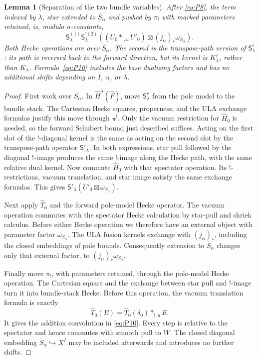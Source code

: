 \documentclass[11pt]{article}
\numberwithin{equation}{section}
\newtheorem{lemma}[theorem]{Lemma}
\theoremstyle{definition}
\theoremstyle{remark}
\begin{document}
\begin{lemma}[Separation of the two bundle variables]
\label{planch:separation}
After \eqref{eq:P8}, the term indexed by $\lambda$, star extended to
$\overline S_\alpha$ and pushed by $\pi_!$ with marked parameters
retained, is, modulo $u$-constants,
\begin{equation}
 \mathsf S_\lambda^{(1)}\mathsf S_\lambda^{\prime(2)}
 \left((U_0*_{!,u}U'_0)\boxtimes
                    (j_\alpha)_*\omega_{S_\alpha}\right).
 \label{eq:P10}
\end{equation}
Both Hecke operations are over $\overline S_\alpha$.  The second is
the transpose-path version of $\mathsf S_\lambda^r$: its path is
reversed back to the forward direction, but its kernel is
$K_\lambda^r$, rather than $K_\lambda$.  Formula~\eqref{eq:P10}
includes the base dualizing factors and has no additional shifts
depending on $I$, $\alpha$, or $\lambda$.
\end{lemma}

\begin{proof}
First work over $S_\alpha$.  In
$\widehat H^\lambda(\widehat F)$, move
$\mathsf S_\lambda^r$ from the pole model to the bundle stack.
The Cartesian Hecke squares, properness, and the ULA exchange formulas
justify this move through $\pi^!$.  Only the vacuum restriction for
$\widehat H_0$ is needed, so the forward Schubert bound just described
suffices.  Acting on the first slot of the $!$-diagonal kernel is the
same as acting on the second slot by the transpose-path operator
$\mathsf S'_\lambda$.  In both expressions, star pull followed by
the diagonal $!$-image produces the same $!$-image along the Hecke
path, with the same relative dual kernel.  Now commute
$\widehat H_0$ with that spectator operation.  Its $!$-restrictions,
vacuum translation, and star image satisfy the same exchange
formulas.  This gives
$\mathsf S'_\lambda(U'_0\boxtimes\omega_{S_\alpha})$.

Next apply $\widehat T_0$ and the forward pole-model Hecke operator.
The vacuum operation commutes with the spectator Hecke calculation
by star-pull and shriek calculus.  Before either Hecke operation we
therefore have an external object with parameter factor
$\omega_{S_\alpha}$.  The ULA fusion kernels exchange with
$(j_\alpha)_*$, including the closed embeddings of pole bounds.
Consequently extension to $\overline S_\alpha$ changes only that
external factor, to $(j_\alpha)_*\omega_{S_\alpha}$.

Finally move $\pi_!$, with parameters retained, through the
pole-model Hecke operation.  The Cartesian square and the exchange
between star pull and $!$-image turn it into bundle-stack Hecke.
Before this operation, the vacuum translation formula is exactly
\[
 \widehat T_0(E)
   =\widehat T_0(\delta_0)*_{!,u}E.
\]
It gives the addition convolution in \eqref{eq:P10}.  Every step
is relative to the spectator and hence commutes with smooth pull to
$W$.  The closed diagonal embedding
$\overline S_\alpha\hookrightarrow X^I$ may be included afterwards
and introduces no further shifts.
\end{proof}
\end{document}
